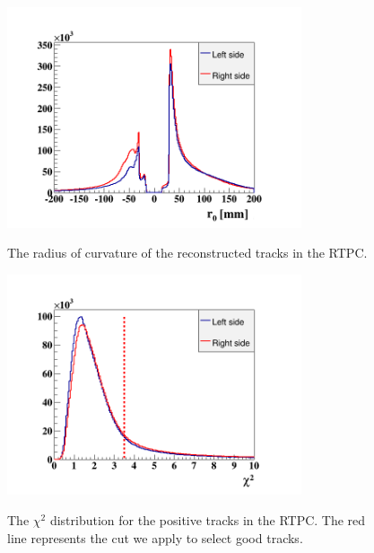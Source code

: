 \begin{itemize}
\begin{figure}[tbp]
\begin{minipage}[c]{.46\linewidth}
\hspace{-0.3in}
\includegraphics[height=6.5cm]{fig_rtpc/rtpc_r0.png}
\caption{The radius of curvature of the reconstructed tracks in the RTPC.} 
\vspace{0.4in}
\label{fig:rtpc_ro}
\end{minipage} \hfill
\begin{minipage}[c]{.46\linewidth}
\hspace{-0.3in}
\includegraphics[height=6.5cm]{fig_rtpc/rtpc_X2.png}
\caption{The $\chi^{2}$ distribution for the positive tracks in the RTPC. The red line represents the cut we apply to select good tracks.}
\vspace{+0.1in}
\label{fig:rrtpc_X2}
\end{minipage}
\end{figure}


\end{itemize}
